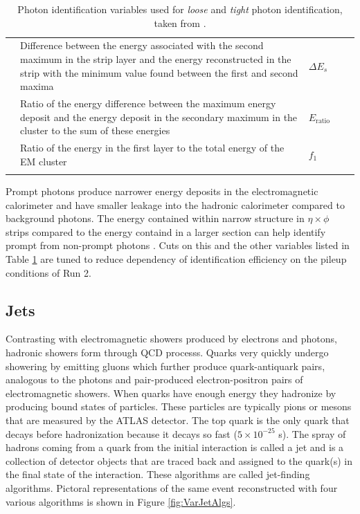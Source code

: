 \begin{center}
\begin{table}
{{\begin{tabularx}{1.25 \textwidth}{ l X lll }
		 & Difference between the energy associated with the second maximum in the strip layer and the energy reconstructed in the strip with the minimum value found between the first and second maxima & $\Delta E_s$ &  &   \checkmark \\
		 & Ratio of the energy difference between the maximum energy deposit and the energy deposit in the secondary maximum in the cluster to the sum of these energies & $E_\text{ratio}$ &  &  \checkmark \\
		 & Ratio of the energy in the first layer to the total energy of the EM cluster & $f_1$ &  &  \checkmark \\
\hhline{=====}
\end{tabularx}
\normalsize
}}
\caption[Photon identification variables used for \textit{loose} and \textit{tight} photon identification.]{Photon identification variables used for \textit{loose} and \textit{tight} photon identification, taken from \cite{PhotonID}.}
\label{tab:PhotonVars}
\end{table}
\end{center}

Prompt photons produce narrower energy deposits in the electromagnetic calorimeter and have smaller leakage into the hadronic calorimeter compared to background photons.  The energy contained within narrow structure in $\eta \times \phi$ strips compared to the energy containd in a larger section can help identify prompt from non-prompt photons \cite{PhotonID}.  Cuts on this and the other variables listed in Table \ref{tab:PhotonVars} are tuned to reduce dependency of identification efficiency on the pileup conditions of Run 2.


\subsection{Jets}

Contrasting with electromagnetic showers produced by electrons and photons, hadronic showers form through QCD processs.  Quarks very quickly undergo showering by emitting gluons which further produce quark-antiquark pairs, analogous to the photons and pair-produced electron-positron pairs of electromagnetic showers.   When quarks have enough energy they hadronize by producing bound states of particles.  These particles are typically pions or mesons that are measured by the ATLAS detector.  The top quark is the only quark that decays before hadronization because it decays so fast ($5\times10^{-25}$ s).  The spray of hadrons coming from a quark from the initial interaction is called a jet and is a collection of detector objects that are traced back and assigned to the quark(s) in the final state of the interaction.  These algorithms are called jet-finding algorithms.  Pictoral representations of the same event reconstructed with four various algorithms is shown in Figure \ref{fig:VarJetAlgs}.

